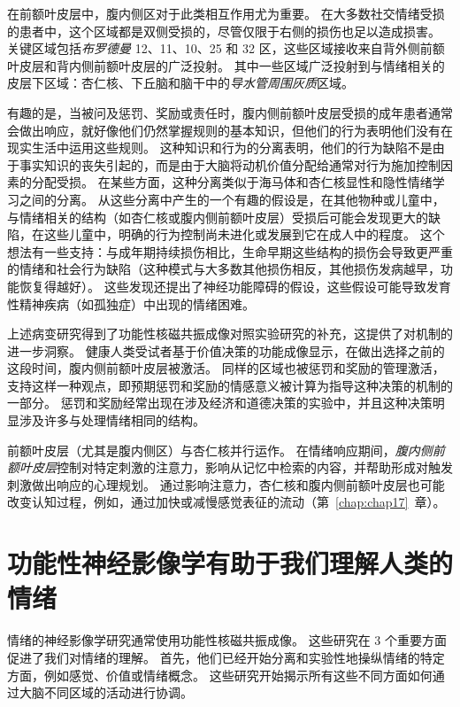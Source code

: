 在前额叶皮层中，腹内侧区对于此类相互作用尤为重要。
在大多数社交情绪受损的患者中，这个区域都是双侧受损的，尽管仅限于右侧的损伤也足以造成损害。
关键区域包括\textit{布罗德曼} 12、11、10、25 和 32 区，这些区域接收来自背外侧前额叶皮层和背内侧前额叶皮层的广泛投射。
其中一些区域广泛投射到与情绪相关的皮层下区域：杏仁核、下丘脑和脑干中的\textit{导水管周围灰质}区域。


有趣的是，当被问及惩罚、奖励或责任时，腹内侧前额叶皮层受损的成年患者通常会做出响应，就好像他们仍然掌握规则的基本知识，但他们的行为表明他们没有在现实生活中运用这些规则。
这种知识和行为的分离表明，他们的行为缺陷不是由于事实知识的丧失引起的，而是由于大脑将动机价值分配给通常对行为施加控制因素的分配受损。
在某些方面，这种分离类似于海马体和杏仁核显性和隐性情绪学习之间的分离。
从这些分离中产生的一个有趣的假设是，在其他物种或儿童中，与情绪相关的结构（如杏仁核或腹内侧前额叶皮层）受损后可能会发现更大的缺陷，在这些儿童中，明确的行为控制尚未进化或发展到它在成人中的程度。
这个想法有一些支持：与成年期持续损伤相比，生命早期这些结构的损伤会导致更严重的情绪和社会行为缺陷（这种模式与大多数其他损伤相反，其他损伤发病越早，功能恢复得越好）。
这些发现还提出了神经功能障碍的假设，这些假设可能导致发育性精神疾病（如孤独症）中出现的情绪困难。


上述病变研究得到了功能性核磁共振成像对照实验研究的补充，这提供了对机制的进一步洞察。
健康人类受试者基于价值决策的功能成像显示，在做出选择之前的这段时间，腹内侧前额叶皮层被激活。
同样的区域也被惩罚和奖励的管理激活，支持这样一种观点，即预期惩罚和奖励的情感意义被计算为指导这种决策的机制的一部分。
惩罚和奖励经常出现在涉及经济和道德决策的实验中，并且这种决策明显涉及许多与处理情绪相同的结构。


前额叶皮层（尤其是腹内侧区）与杏仁核并行运作。
在情绪响应期间，\textit{腹内侧前额叶皮层}控制对特定刺激的注意力，影响从记忆中检索的内容，并帮助形成对触发刺激做出响应的心理规划。
通过影响注意力，杏仁核和腹内侧前额叶皮层也可能改变认知过程，例如，通过加快或减慢感觉表征的流动（第~\ref{chap:chap17}~章）。


\section{功能性神经影像学有助于我们理解人类的情绪}

情绪的神经影像学研究通常使用功能性核磁共振成像。
这些研究在 3 个重要方面促进了我们对情绪的理解。
首先，他们已经开始分离和实验性地操纵情绪的特定方面，例如感觉、价值或情绪概念。
这些研究开始揭示所有这些不同方面如何通过大脑不同区域的活动进行协调。


